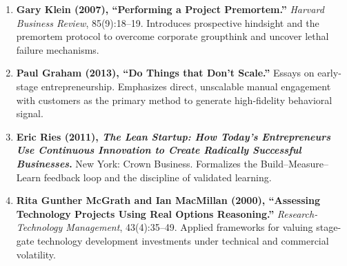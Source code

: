 \begin{enumerate}[leftmargin=14pt,itemsep=3pt,topsep=2pt,parsep=0pt]
  \item \textbf{Gary Klein (2007), ``Performing a Project Premortem.''} \textit{Harvard Business Review}, 85(9):18--19. Introduces prospective hindsight and the premortem protocol to overcome corporate groupthink and uncover lethal failure mechanisms.

  \item \textbf{Paul Graham (2013), ``Do Things that Don't Scale.''} Essays on early-stage entrepreneurship. Emphasizes direct, unscalable manual engagement with customers as the primary method to generate high-fidelity behavioral signal.

  \item \textbf{Eric Ries (2011), \textit{The Lean Startup: How Today's Entrepreneurs Use Continuous Innovation to Create Radically Successful Businesses}.} New York: Crown Business. Formalizes the Build--Measure--Learn feedback loop and the discipline of validated learning.

  \item \textbf{Rita Gunther McGrath and Ian MacMillan (2000), ``Assessing Technology Projects Using Real Options Reasoning.''} \textit{Research-Technology Management}, 43(4):35--49. Applied frameworks for valuing stage-gate technology development investments under technical and commercial volatility.
\end{enumerate}
